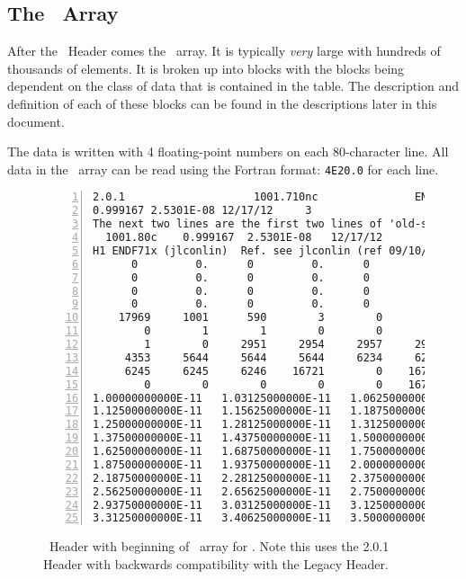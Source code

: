 \subsection{The \XSS\ Array}
After the \ACE\ Header comes the \XSS\ array. It is typically \emph{very} large with hundreds of thousands of elements. It is broken up into blocks with the blocks being dependent on the class of data that is contained in the table. The description and definition of each of these blocks can be found in the descriptions later in this document.

The data is written with \num{4} floating-point numbers on each 80-character line.  All data in the \XSS\ array can be read using the Fortran format: \texttt{4E20.0} for each line.

\begin{figure}[h!] \centering
\begin{Verbatim}[frame=single,fontsize=\footnotesize,numbers=left, numbersep=2pt]
2.0.1                    1001.710nc               ENDFB-VII.1             
0.999167 2.5301E-08 12/17/12     3
The next two lines are the first two lines of 'old-style' ACE.
  1001.80c    0.999167  2.5301E-08   12/17/12
H1 ENDF71x (jlconlin)  Ref. see jlconlin (ref 09/10/2012  10:00:53)      mat 125
      0         0.      0         0.      0         0.      0         0.
      0         0.      0         0.      0         0.      0         0.
      0         0.      0         0.      0         0.      0         0.
      0         0.      0         0.      0         0.      0         0.
    17969     1001      590        3        0        1        1        0
        0        1        1        0        0        0        0        0
        1        0     2951     2954     2957     2960     2963     4352
     4353     5644     5644     5644     6234     6235     6236     6244
     6245     6245     6246    16721        0    16722        0        0
        0        0        0        0        0    16723    16724    16725
1.00000000000E-11   1.03125000000E-11   1.06250000000E-11   1.09375000000E-11
1.12500000000E-11   1.15625000000E-11   1.18750000000E-11   1.21875000000E-11
1.25000000000E-11   1.28125000000E-11   1.31250000000E-11   1.34375000000E-11
1.37500000000E-11   1.43750000000E-11   1.50000000000E-11   1.56250000000E-11
1.62500000000E-11   1.68750000000E-11   1.75000000000E-11   1.81250000000E-11
1.87500000000E-11   1.93750000000E-11   2.00000000000E-11   2.09375000000E-11
2.18750000000E-11   2.28125000000E-11   2.37500000000E-11   2.46875000000E-11
2.56250000000E-11   2.65625000000E-11   2.75000000000E-11   2.84375000000E-11
2.93750000000E-11   3.03125000000E-11   3.12500000000E-11   3.21875000000E-11
3.31250000000E-11   3.40625000000E-11   3.50000000000E-11   3.59375000000E-11
\end{Verbatim}
\caption{\ACE\ Header with beginning of \XSS\ array for . Note this uses the 2.0.1 Header with backwards compatibility with the Legacy Header.}
  \label{fig:XSSExample}
\end{figure}
